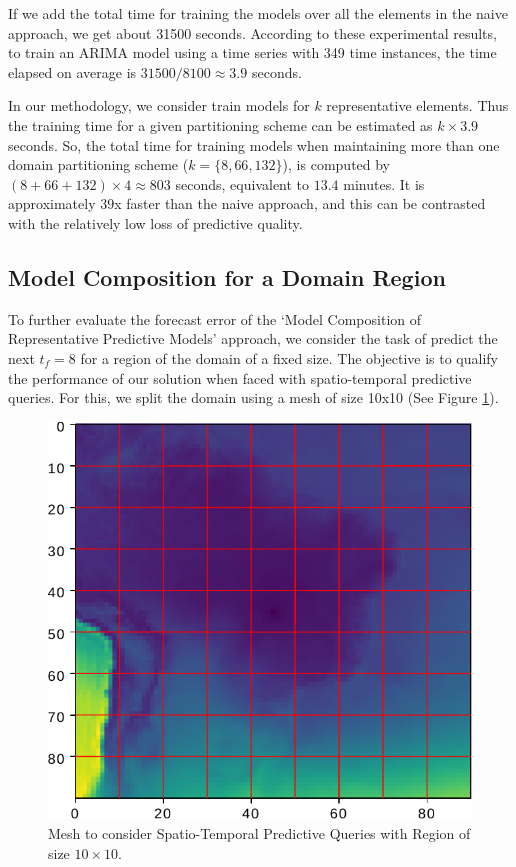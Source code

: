 If we add the total time for training the models over all the elements in the naive approach, we get about 31500 seconds. According to these experimental results, to train an ARIMA model using a time series with 349 time instances, the time elapsed on average is $31500 / 8100 \approx 3.9$ seconds. 

In our methodology, we consider train models for $k$ representative elements. Thus the training time for a given partitioning scheme can be estimated as $k \times 3.9$ seconds. So, the total time for training models when maintaining more than one domain partitioning scheme ($k = \{8, 66, 132\}$), is computed by $(8 + 66  + 132) \times 4 \approx 803$ seconds, equivalent to $13.4$ minutes. It is approximately $39$x faster than the naive approach, and this can be contrasted with the relatively low loss of predictive quality.

\subsection{Model Composition for a Domain Region}
\label{Sec:ModelCompositionAggregated}

To further evaluate the forecast error of the `Model Composition of Representative Predictive Models’ approach, we consider the task of predict the next $t_{f}=8$ for a region of the domain of a fixed size. The objective is to qualify the performance of our solution when faced with spatio-temporal predictive queries. For this, we split the domain using a mesh of size 10x10 (See Figure \ref{Fig:Query_10x10_whole_real_brazil}).

\begin{figure}[h]
	\centering
	\includegraphics[scale=0.75]{../Figures/query_10x10_whole_real_brazil}
	\caption{Mesh to consider Spatio-Temporal Predictive Queries with Region of size $10 \times 10$.}
	\label{Fig:Query_10x10_whole_real_brazil}
\end{figure}

